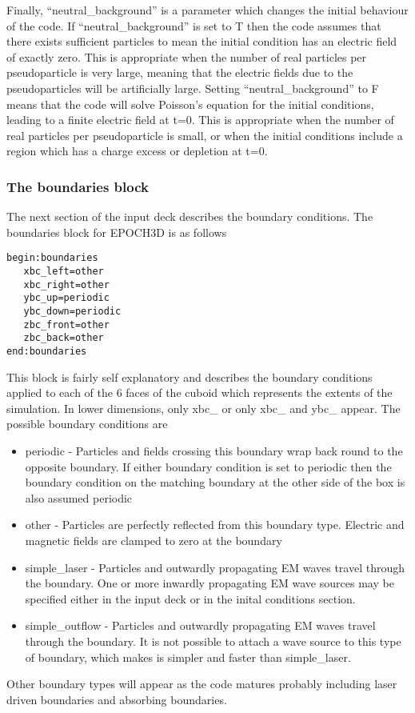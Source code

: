 \documentclass[12pt]{article}
\newcommand{\simpleboxverbatim}{\begin{Verbatim}[obeytabs=true,frame=single,
  framerule=0.5mm,rulecolor=\color{warwickmid}]}
\begin{document}
Finally, ``neutral\_background'' is a parameter which changes the initial
behaviour of the code. If ``neutral\_background'' is set to T then the code
assumes that there exists sufficient particles to mean the initial condition
has an electric field of exactly zero. This is appropriate when the number of
real particles per pseudoparticle is very large, meaning that the electric
fields due to the pseudoparticles will be artificially large. Setting
``neutral\_background'' to F means that the code will solve Poisson's equation
for the initial conditions, leading to a finite electric field at t=0. This is
appropriate when the number of real particles per pseudoparticle is small, or
when the initial conditions include a region which has a charge excess or
depletion at t=0.\\

\subsubsection{The boundaries block}
The next section of the input deck describes the boundary conditions. The
boundaries block for EPOCH3D is as follows\\
\simpleboxverbatim
begin:boundaries
   xbc_left=other
   xbc_right=other
   ybc_up=periodic
   ybc_down=periodic
   zbc_front=other
   zbc_back=other
end:boundaries
\end{Verbatim}

This block is fairly self explanatory and describes the boundary conditions
applied to each of the 6 faces of the cuboid which represents the extents of
the simulation. In lower dimensions, only xbc\_ or only xbc\_ and ybc\_
appear. The possible boundary conditions are\\
\begin{itemize}
\item periodic - Particles and fields crossing this boundary wrap back round
  to the opposite boundary. If either boundary condition is set to periodic
  then the boundary condition on the matching boundary at the other side of
  the box is also assumed periodic
\item other - Particles are perfectly reflected from this boundary
  type. Electric and magnetic fields are clamped to zero at the boundary
\item simple\_laser - Particles and outwardly propagating EM waves travel
  through the boundary. One or more inwardly propagating EM wave sources may
  be specified either in the input deck or in the inital conditions section.
\item simple\_outflow - Particles and outwardly propagating EM waves travel
  through the boundary. It is not possible to attach a wave source to this
  type of boundary, which makes is simpler and faster than simple\_laser.
\end{itemize}
Other boundary types will appear as the code matures probably including laser
driven boundaries and absorbing boundaries.\\
\end{document}

